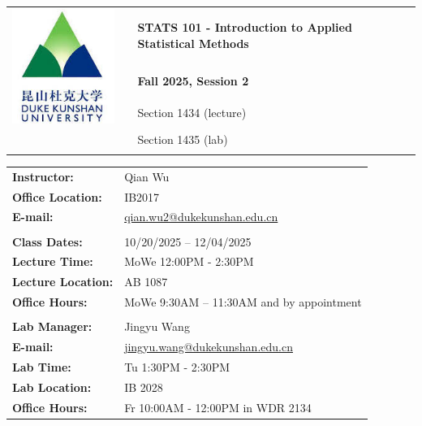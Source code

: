 \documentclass[11pt]{article}
\begin{document}
\noindent \hspace{-4mm} \begin{tabular}{ l c l }
  \multirow{3}{*}{\includegraphics[scale=.5]{syllabus/logo.jpeg}} && \Large\textbf{STATS 101 - Introduction to Applied Statistical Methods}\\[5pt]
  && \Large \textbf{Fall 2025, Session 2}\\[24pt]
  && Section 1434 (lecture)\\
  && Section 1435 (lab)\\\\
\end{tabular}

\noindent  \hspace{-4mm}  \begin{tabular}{ l l }
  \textbf{Instructor:} 			& \large Qian Wu \\
  \textbf{Office Location:} 	& \large IB2017\\
  \textbf{E-mail:} 				& \large \href{mailto:qian.wu2@dukekunshan.edu.cn}{qian.wu2@dukekunshan.edu.cn} \\\\
 
  \textbf{Class Dates:}			& 10/20/2025 – 12/04/2025 \\
  \textbf{Lecture Time:}			& \large MoWe 12:00PM - 2:30PM\\
  \textbf{Lecture Location:} 		& \large AB 1087\\
    \textbf{Office Hours:} & \large MoWe 9:30AM -- 11:30AM and by appointment\\
     & \\
 \textbf{Lab Manager: }          & \large{Jingyu Wang} \\
\textbf{E-mail: }          & \large{\href{mailto:jingyu.wang@dukekunshan.edu.cn}{jingyu.wang@dukekunshan.edu.cn}} \\
 \textbf{Lab Time:}              & \large Tu 1:30PM - 2:30PM\\
 \textbf{Lab Location:}          & \large IB 2028\\
 \textbf{Office Hours:} & \large Fr 10:00AM - 12:00PM in WDR 2134\\



\end{tabular}
\end{document}
